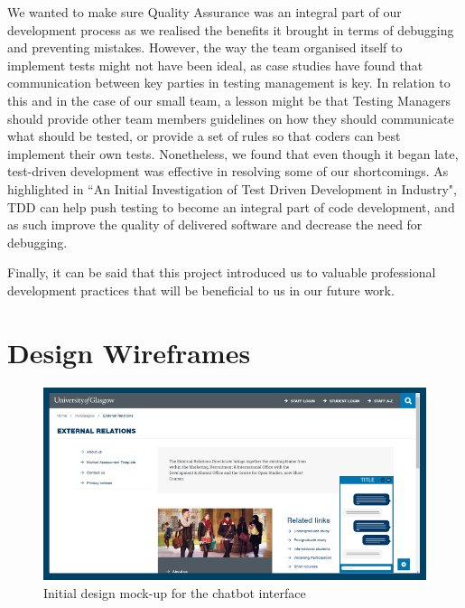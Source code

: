 \documentclass{l3proj}
\begin{document}
We wanted to make sure Quality Assurance was an integral part of our development process as we realised the benefits it brought in terms of debugging and preventing mistakes. However, the way the team organised itself to implement tests might not have been ideal, as case studies have found that communication between key parties in testing management is key\cite{test:Parveen}. In relation to this and in the case of our small team, a lesson might be that Testing Managers should provide other team members guidelines on how they should communicate what should be tested, or provide a set of rules so that coders can best implement their own tests.
Nonetheless, we found that even though it began late, test-driven development was effective in resolving some of our shortcomings. As highlighted in ``An Initial Investigation of Test Driven Development in Industry", TDD can help push testing to become an integral part of code development\cite{tdd:George}, and as such improve the quality of delivered software and decrease the need for debugging.

Finally, it can be said that this project introduced us to valuable professional development practices that will be beneficial to us in our future work.


\clearpage



\bigskip
\bigskip

\appendix
\section{Design Wireframes}
\label{apdx:wireframes}

\begin{figure}[h!]
    \centering
    \includegraphics[width=0.85\linewidth]{figures/wireframe-background.png}
    \caption{Initial design mock-up for the chatbot interface}
\end{figure}
\end{document}
